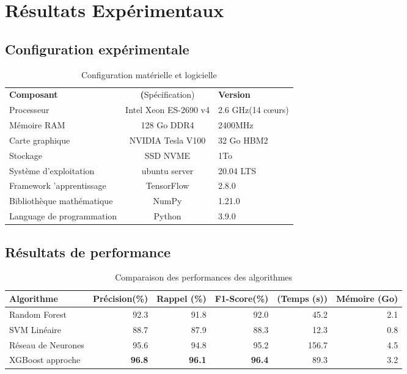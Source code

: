 \chapter{Résultats Expérimentaux}

\section{Configuration expérimentale}

\begin{table}[H]
	\centering
	\caption{Configuration matérielle et logicielle}
	\begin{tabular}{p{8cm}cp{4cm}}
		\toprule
		\textbf{Composant} & \textbf(Spécification) & \textbf{Version} \\
		Processeur & Intel Xeon ES-2690 v4 & 2.6 GHz(14 cœurs) \\
		Mémoire RAM & 128 Go DDR4 & 2400MHz \\
		Carte graphique & NVIDIA Tesla V100 & 32 Go HBM2 \\ 
		Stockage & SSD NVME & 1To \\
		Système d'exploitation & ubuntu server & 20.04 LTS \\
		Framework 'apprentissage & TensorFlow & 2.8.0 \\
		Bibliothèque mathématique & NumPy & 1.21.0 \\
		Language de programmation & Python & 3.9.0 \\
		\bottomrule
	\end{tabular}
	\label{tab:experimental-setup}
\end{table}

\section{Résultats de performance}

\begin{table}[H]
	\centering
	\caption{Comparaison des performances des algorithmes}
	\begin{tabular}{lrrrrr}
		\toprule
		\textbf{Algorithme} & \textbf{Précision(\%)} & \textbf{Rappel (\%)} & \textbf{F1-Score(\%)} & \textbf(Temps (s)) & \textbf{Mémoire (Go)} \\
		\midrule
		Random Forest & 92.3 & 91.8 & 92.0 & 45.2 & 2.1 \\
		SVM Linéaire & 88.7 & 87.9 & 88.3 & 12.3 & 0.8 \\
		Réseau de Neurones & 95.6 & 94.8 & 95.2 & 156.7 & 4.5 \\
		XGBoost approche & \textbf{96.8} & \textbf{96.1}  & \textbf{96.4} & 89.3 & 3.2 \\
		\bottomrule
	\end{tabular}
	\label{tab:performance-comparaison}
\end{table}

